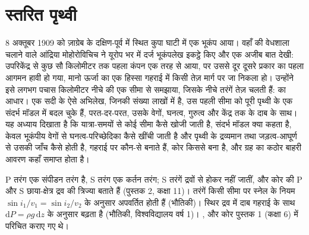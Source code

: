 \chapter{स्तरित पृथ्वी}\label{ch:b1:layered-earth}

8 अक्तूबर 1909 को ज़ाग्रेब के दक्षिण-पूर्व में स्थित कुपा घाटी में एक भूकंप आया।
वहाँ की वेधशाला चलाने वाले आंद्रिया मोहोरोविचिच ने यूरोप भर में दर्ज भूकंपलेख इकट्ठे किए और एक अजीब बात देखी: उपरिकेंद्र से कुछ सौ किलोमीटर तक पहला कंपन एक तरह से आया, पर उससे दूर दूसरे प्रकार का पहला आगमन हावी हो गया, मानो ऊर्जा का एक हिस्सा गहराई में किसी तेज़ मार्ग पर जा निकला हो। उन्होंने इसे लगभग पचास किलोमीटर नीचे की एक सीमा से समझाया, जिसके नीचे तरंगें तेज़ चलती हैं:  का आधार। एक सदी के ऐसे अभिलेख, जिनकी संख्या लाखों में है, उस पहली सीमा को पूरी पृथ्वी के एक संदर्भ मॉडल में बदल चुके हैं, परत-दर-परत, उसके वेगों, घनत्व, गुरुत्व और केंद्र तक के दाब के साथ। यह अध्याय दिखाता है कि यात्रा-समयों से कोई सीमा कैसे खोजी जाती है, संदर्भ मॉडल क्या कहता है, केवल भूकंपीय वेगों से घनत्व-परिच्छेदिका कैसे खींची जाती है और पृथ्वी के द्रव्यमान तथा जड़त्व-आघूर्ण से उसकी जाँच कैसे होती है, गहराई पर कौन-से   बनाते हैं, कोर किससे बना है, और ग्रह का कठोर बाहरी आवरण कहाँ समाप्त होता है।

\begin{recall}
P तरंग एक संपीडन तरंग है, S तरंग एक कर्तन तरंग; S तरंगें द्रवों से होकर नहीं जातीं, और कोर की P और S छाया-क्षेत्र द्रव  की त्रिज्या बताते हैं (पुस्तक 2, कक्षा 11)। तरंगें किसी सीमा पर स्नेल के नियम $\sin i_1/v_1 = \sin i_2/v_2$ के अनुसार अपवर्तित होती हैं (भौतिकी)। स्थिर द्रव में दाब गहराई के साथ $\mathrm dP = \rho g\,\mathrm dz$ के अनुसार बढ़ता है (भौतिकी, विश्वविद्यालय वर्ष 1)। ,  और कोर पुस्तक 1 (कक्षा 6) में परिचित कराए गए थे।
\end{recall}

